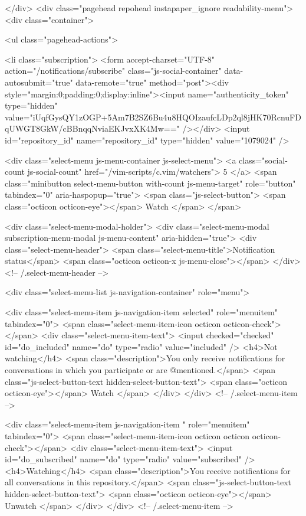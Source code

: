     </div>
    <div class="pagehead repohead instapaper_ignore readability-menu">
      <div class="container">
        

<ul class="pagehead-actions">

    <li class="subscription">
      <form accept-charset="UTF-8" action="/notifications/subscribe" class="js-social-container" data-autosubmit="true" data-remote="true" method="post"><div style="margin:0;padding:0;display:inline"><input name="authenticity_token" type="hidden" value="iUqfGysQY1zOGP+5Am7B2SZ6Bu4u8HQOIzaufcLDp2ql8jHK70RcnuFDqUWGT8GkW/cBBnqqNviaEKJvxXK4Mw==" /></div>  <input id="repository_id" name="repository_id" type="hidden" value="1079024" />

    <div class="select-menu js-menu-container js-select-menu">
      <a class="social-count js-social-count" href="/vim-scripts/c.vim/watchers">
        5
      </a>
      <span class="minibutton select-menu-button with-count js-menu-target" role="button" tabindex="0" aria-haspopup="true">
        <span class="js-select-button">
          <span class="octicon octicon-eye"></span>
          Watch
        </span>
      </span>

      <div class="select-menu-modal-holder">
        <div class="select-menu-modal subscription-menu-modal js-menu-content" aria-hidden="true">
          <div class="select-menu-header">
            <span class="select-menu-title">Notification status</span>
            <span class="octicon octicon-x js-menu-close"></span>
          </div> <!-- /.select-menu-header -->

          <div class="select-menu-list js-navigation-container" role="menu">

            <div class="select-menu-item js-navigation-item selected" role="menuitem" tabindex="0">
              <span class="select-menu-item-icon octicon octicon-check"></span>
              <div class="select-menu-item-text">
                <input checked="checked" id="do_included" name="do" type="radio" value="included" />
                <h4>Not watching</h4>
                <span class="description">You only receive notifications for conversations in which you participate or are @mentioned.</span>
                <span class="js-select-button-text hidden-select-button-text">
                  <span class="octicon octicon-eye"></span>
                  Watch
                </span>
              </div>
            </div> <!-- /.select-menu-item -->

            <div class="select-menu-item js-navigation-item " role="menuitem" tabindex="0">
              <span class="select-menu-item-icon octicon octicon octicon-check"></span>
              <div class="select-menu-item-text">
                <input id="do_subscribed" name="do" type="radio" value="subscribed" />
                <h4>Watching</h4>
                <span class="description">You receive notifications for all conversations in this repository.</span>
                <span class="js-select-button-text hidden-select-button-text">
                  <span class="octicon octicon-eye"></span>
                  Unwatch
                </span>
              </div>
            </div> <!-- /.select-menu-item -->

